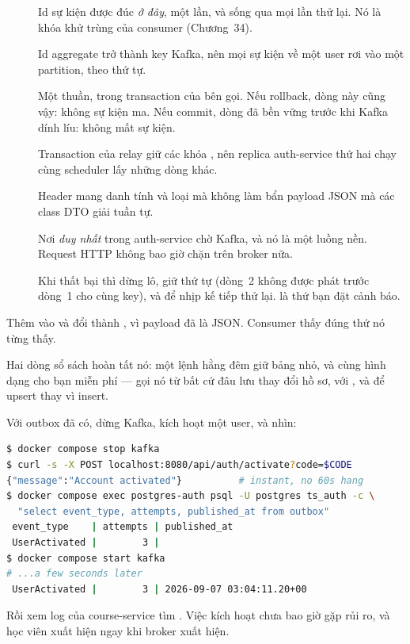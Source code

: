 \begin{description}
  \item[] Id sự kiện được đúc \emph{ở đây}, một lần, và sống qua
  mọi lần thử lại. Nó là khóa khử trùng của consumer (Chương~34).
  \item[] Id aggregate trở thành key Kafka, nên mọi sự kiện về
  một user rơi vào một partition, theo thứ tự.
  \item[] Một  thuần, trong transaction của bên gọi.
  Nếu  rollback, dòng này cũng vậy: không sự kiện ma.
  Nếu commit, dòng đã bền vững trước khi Kafka dính líu: không mất sự
  kiện.
  \item[] Transaction của relay giữ các khóa , nên replica auth-service thứ hai chạy cùng scheduler lấy
  những dòng khác.
  \item[] Header mang danh tính và loại mà không làm bẩn payload
  JSON mà các class DTO giải tuần tự.
  \item[] Nơi \emph{duy nhất} trong auth-service chờ Kafka, và nó
  là một luồng nền. Request HTTP không bao giờ chặn trên broker nữa.
  \item[] Khi thất bại thì dừng lô, giữ thứ tự (dòng~2 không được
  phát trước dòng~1 cho cùng key), và để nhịp kế tiếp thử lại.
   là thứ bạn đặt cảnh báo.
\end{description}

Thêm  vào  và đổi
 thành , vì payload đã là
JSON. Consumer thấy đúng thứ nó từng thấy.

Hai dòng sổ sách hoàn tất nó: một lệnh hằng đêm
giữ bảng nhỏ, và cùng hình dạng  cho bạn
 miễn phí --- gọi nó từ bất cứ đâu lưu thay đổi
hồ sơ, với , và để
 upsert thay vì insert.

\begin{handson}
Với outbox đã có, dừng Kafka, kích hoạt một user, và nhìn:
\begin{lstlisting}[language=bash]
$ docker compose stop kafka
$ curl -s -X POST localhost:8080/api/auth/activate?code=$CODE
{"message":"Account activated"}          # instant, no 60s hang
$ docker compose exec postgres-auth psql -U postgres ts_auth -c \
  "select event_type, attempts, published_at from outbox"
 event_type    | attempts | published_at
 UserActivated |        3 |
$ docker compose start kafka
# ...a few seconds later
 UserActivated |        3 | 2026-09-07 03:04:11.20+00
\end{lstlisting}
Rồi xem log của course-service tìm . Việc
kích hoạt chưa bao giờ gặp rủi ro, và học viên xuất hiện ngay khi
broker xuất hiện.
\end{handson}


